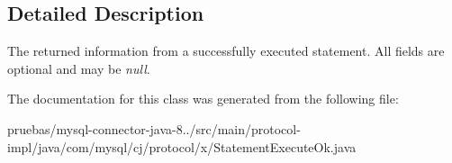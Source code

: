 \subsection{Detailed Description}
The returned information from a successfully executed statement. All fields are optional and may be {\itshape null}. 

The documentation for this class was generated from the following file\+:\begin{DoxyCompactItemize}
\item 
pruebas/mysql-\/connector-\/java-\/8../src/main/protocol-\/impl/java/com/mysql/cj/protocol/x/Statement\+Execute\+Ok.\+java\end{DoxyCompactItemize}

